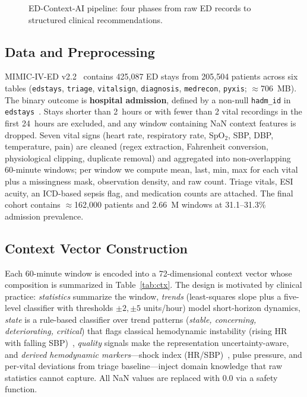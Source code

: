 \documentclass[runningheads]{llncs}
\begin{document}
\begin{figure}[t]
\centering
\small
{}
\caption{ED-Context-AI pipeline: four phases from raw ED records to structured clinical recommendations.}
\label{fig:pipeline}
\end{figure}

\subsection{Data and Preprocessing}
MIMIC-IV-ED v2.2~\cite{Johnson2023} contains 425{,}087 ED stays from 205{,}504 patients across six tables (\texttt{edstays}, \texttt{triage}, \texttt{vitalsign}, \texttt{diagnosis}, \texttt{medrecon}, \texttt{pyxis}; $\approx$706~MB). The binary outcome is \textbf{hospital admission}, defined by a non-null \texttt{hadm\_id} in \texttt{edstays}~\cite{Xie2022}. Stays shorter than 2~hours or with fewer than 2 vital recordings in the first 24~hours are excluded, and any window containing NaN context features is dropped. Seven vital signs (heart rate, respiratory rate, SpO$_2$, SBP, DBP, temperature, pain) are cleaned (regex extraction, Fahrenheit conversion, physiological clipping, duplicate removal) and aggregated into non-overlapping 60-minute windows; per window we compute mean, last, min, max for each vital plus a missingness mask, observation density, and raw count. Triage vitals, ESI acuity, an ICD-based sepsis flag, and medication counts are attached. The final cohort contains $\approx$162{,}000 patients and 2.66~M windows at 31.1--31.3\% admission prevalence.

\subsection{Context Vector Construction}
Each 60-minute window is encoded into a 72-dimensional context vector whose composition is summarized in Table~\ref{tab:ctx}. The design is motivated by clinical practice: \textit{statistics} summarize the window, \textit{trends} (least-squares slope plus a five-level classifier with thresholds $\pm 2, \pm 5$ units/hour) model short-horizon dynamics, \textit{state} is a rule-based classifier over trend patterns (\textit{stable, concerning, deteriorating, critical}) that flags classical hemodynamic instability (rising HR with falling SBP)~\cite{Hoot2008}, \textit{quality} signals make the representation uncertainty-aware, and \textit{derived hemodynamic markers}---shock index (HR/SBP)~\cite{Koch2019}, pulse pressure, and per-vital deviations from triage baseline---inject domain knowledge that raw statistics cannot capture. All NaN values are replaced with 0.0 via a safety function.
\end{document}
